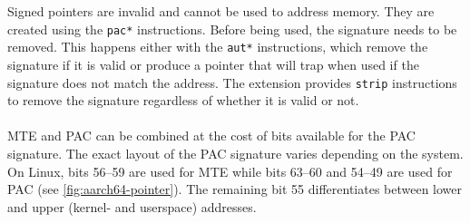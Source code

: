Signed pointers are invalid and cannot be used to address memory.
They are created using the \texttt{pac*} instructions.
Before being used, the signature needs to be removed.
This happens either with the \texttt{aut*} instructions, which remove the signature if it is valid or produce a pointer that will trap when used if the signature does not match the address.
The extension provides \texttt{strip} instructions to remove the signature regardless of whether it is valid or not.

\paragraph{} \ac{MTE} and \ac{PAC} can be combined at the cost of bits available for the \ac{PAC} signature.
The exact layout of the \ac{PAC} signature varies depending on the system.
On Linux, bits 56--59 are used for \ac{MTE} while bits 63--60 and 54--49 are used for \ac{PAC} (see \cref{fig:aarch64-pointer}).
The remaining bit 55 differentiates between lower and upper (kernel- and userspace) addresses.
